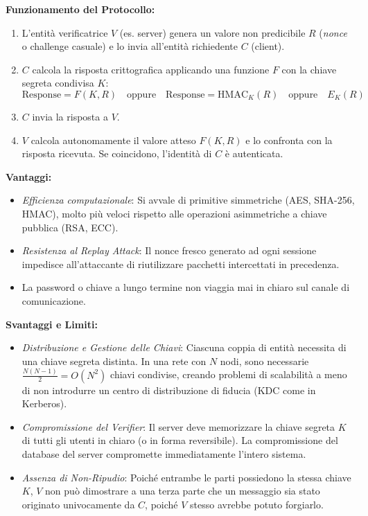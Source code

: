 \documentclass[11pt,a4paper]{article}
\begin{document}
\begin{solutionbox}
\textbf{Funzionamento del Protocollo:}
\begin{enumerate}
    \item L'entit\`a verificatrice $V$ (es. server) genera un valore non predicibile $R$ (\textit{nonce} o challenge casuale) e lo invia all'entit\`a richiedente $C$ (client).
    \item $C$ calcola la risposta crittografica applicando una funzione $F$ con la chiave segreta condivisa $K$:
    \[
    \text{Response} = F(K, R) \quad \text{oppure} \quad \text{Response} = \text{HMAC}_K(R) \quad \text{oppure} \quad E_K(R)
    \]
    \item $C$ invia la risposta a $V$.
    \item $V$ calcola autonomamente il valore atteso $F(K, R)$ e lo confronta con la risposta ricevuta. Se coincidono, l'identit\`a di $C$ \`e autenticata.
\end{enumerate}

\textbf{Vantaggi:}
\begin{itemize}
    \item \textit{Efficienza computazionale}: Si avvale di primitive simmetriche (AES, SHA-256, HMAC), molto pi\`u veloci rispetto alle operazioni asimmetriche a chiave pubblica (RSA, ECC).
    \item \textit{Resistenza al Replay Attack}: Il nonce fresco generato ad ogni sessione impedisce all'attaccante di riutilizzare pacchetti intercettati in precedenza.
    \item La password o chiave a lungo termine non viaggia mai in chiaro sul canale di comunicazione.
\end{itemize}

\textbf{Svantaggi e Limiti:}
\begin{itemize}
    \item \textit{Distribuzione e Gestione delle Chiavi}: Ciascuna coppia di entit\`a necessita di una chiave segreta distinta. In una rete con $N$ nodi, sono necessarie $\frac{N(N-1)}{2} = O(N^2)$ chiavi condivise, creando problemi di scalabilit\`a a meno di non introdurre un centro di distribuzione di fiducia (KDC come in Kerberos).
    \item \textit{Compromissione del Verifier}: Il server deve memorizzare la chiave segreta $K$ di tutti gli utenti in chiaro (o in forma reversibile). La compromissione del database del server compromette immediatamente l'intero sistema.
    \item \textit{Assenza di Non-Ripudio}: Poich\'e entrambe le parti possiedono la stessa chiave $K$, $V$ non pu\`o dimostrare a una terza parte che un messaggio sia stato originato univocamente da $C$, poich\'e $V$ stesso avrebbe potuto forgiarlo.
\end{itemize}
\end{solutionbox}
\end{document}
